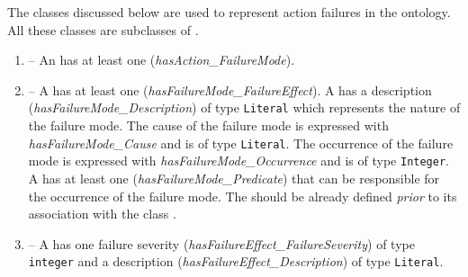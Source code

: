 The classes discussed below are used to represent action failures in the  ontology. All these classes are subclasses of .
\begin{enumerate}
\item {} -- An  has at least one  (\emph{hasAction\_FailureMode}).
\item {} -- A  has at least one  (\emph{hasFailureMode\_FailureEffect}). A  has a description (\emph{hasFailureMode\_Description}) of type \texttt{Literal} which represents the nature of the failure mode. The cause of the failure mode is expressed with \emph{hasFailureMode\_Cause} and is of type \texttt{Literal}. The occurrence of the failure mode is expressed with \emph{hasFailureMode\_Occurrence} and is of type \texttt{Integer}. A  has at least one  (\emph{hasFailureMode\_Predicate}) that can be responsible for the occurrence of the failure mode. The  should be already defined \textit{prior} to its association with the class .
\item {} -- A  has one failure severity (\emph{hasFailureEffect\_FailureSeverity}) of type \texttt{integer} and a description (\emph{hasFailureEffect\_Description}) of type \texttt{Literal}.
\end{enumerate}